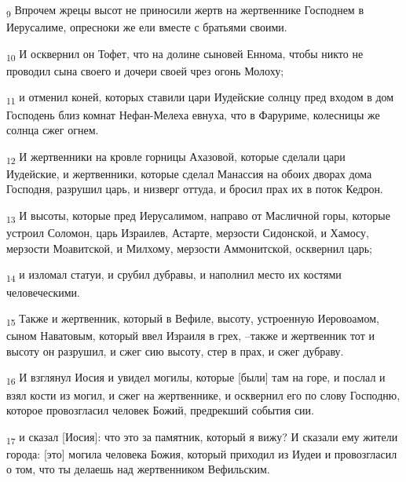 \begin{tcolorbox}
\textsubscript{9} Впрочем жрецы высот не приносили жертв на жертвеннике Господнем в Иерусалиме, опресноки же ели вместе с братьями своими.
\end{tcolorbox}
\begin{tcolorbox}
\textsubscript{10} И осквернил он Тофет, что на долине сыновей Еннома, чтобы никто не проводил сына своего и дочери своей чрез огонь Молоху;
\end{tcolorbox}
\begin{tcolorbox}
\textsubscript{11} и отменил коней, которых ставили цари Иудейские солнцу пред входом в дом Господень близ комнат Нефан-Мелеха евнуха, что в Фаруриме, колесницы же солнца сжег огнем.
\end{tcolorbox}
\begin{tcolorbox}
\textsubscript{12} И жертвенники на кровле горницы Ахазовой, которые сделали цари Иудейские, и жертвенники, которые сделал Манассия на обоих дворах дома Господня, разрушил царь, и низверг оттуда, и бросил прах их в поток Кедрон.
\end{tcolorbox}
\begin{tcolorbox}
\textsubscript{13} И высоты, которые пред Иерусалимом, направо от Масличной горы, которые устроил Соломон, царь Израилев, Астарте, мерзости Сидонской, и Хамосу, мерзости Моавитской, и Милхому, мерзости Аммонитской, осквернил царь;
\end{tcolorbox}
\begin{tcolorbox}
\textsubscript{14} и изломал статуи, и срубил дубравы, и наполнил место их костями человеческими.
\end{tcolorbox}
\begin{tcolorbox}
\textsubscript{15} Также и жертвенник, который в Вефиле, высоту, устроенную Иеровоамом, сыном Наватовым, который ввел Израиля в грех, --также и жертвенник тот и высоту он разрушил, и сжег сию высоту, стер в прах, и сжег дубраву.
\end{tcolorbox}
\begin{tcolorbox}
\textsubscript{16} И взглянул Иосия и увидел могилы, которые [были] там на горе, и послал и взял кости из могил, и сжег на жертвеннике, и осквернил его по слову Господню, которое провозгласил человек Божий, предрекший события сии.
\end{tcolorbox}
\begin{tcolorbox}
\textsubscript{17} и сказал [Иосия]: что это за памятник, который я вижу? И сказали ему жители города: [это] могила человека Божия, который приходил из Иудеи и провозгласил о том, что ты делаешь над жертвенником Вефильским.
\end{tcolorbox}
